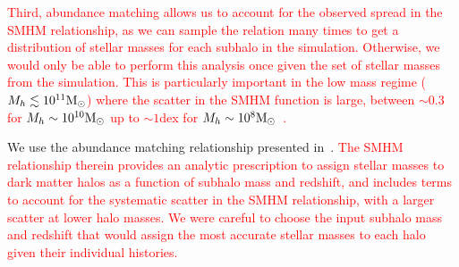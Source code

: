 \documentclass[twocolumn]{aastex631}
\newcommand{\add}[1]{\textcolor{red}{#1}}
\begin{document}
    \add{Third, abundance matching allows us to account for the observed spread in the SMHM relationship, as we can sample the relation many times to get a distribution of stellar masses for each subhalo in the simulation. Otherwise, we would only be able to perform this analysis once given the set of stellar masses from the simulation. 
    This is particularly important in the low mass regime ($M_h \lesssim 10^{11}\mathrm{M}_\odot$) where the scatter in the SMHM function is large, between $\sim 0.3$ for $M_{h}\sim 10^{10}\mathrm{M}_\odot$ up to $\sim 1$dex for $M_{h}\sim10^{8}\mathrm{M}_\odot$~\citep{Munshi2021}. }
    

    
    We use the abundance matching relationship presented in~\citet{Moster2013}.
    \add{The SMHM relationship therein provides an analytic prescription to assign stellar masses to dark matter halos as a function of subhalo mass and redshift, and includes terms to account for the systematic scatter in the SMHM relationship, with a larger scatter at lower halo masses.
    We were careful to choose the input subhalo mass and redshift that would assign the most accurate stellar masses to each halo given their individual histories.}
    
\end{document}
